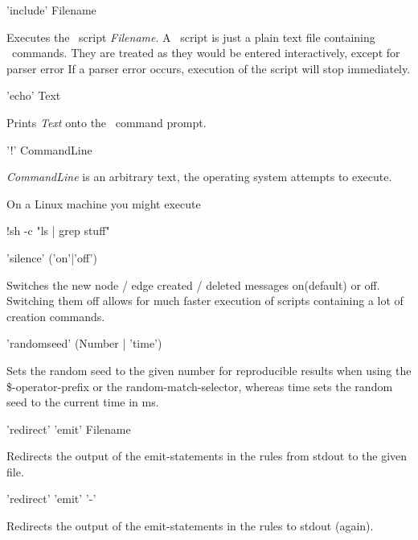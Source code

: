 \begin{rail}
  'include' Filename
\end{rail}
Executes the \GrShell\ script \emph{Filename}.
A \GrShell\ script is just a plain text file containing \GrShell\ commands.
They are treated as they would be entered interactively, except for parser error
If a parser error occurs, execution of the script will stop immediately.

\begin{rail}
  'echo' Text
\end{rail}
Prints \emph{Text} onto the \GrShell\ command prompt.

\begin{rail}
  '!' CommandLine
\end{rail}
\emph{CommandLine} is an arbitrary text, the operating system attempts to execute.
\begin{example}
On a Linux machine you might execute
\begin{grshell}
!sh -c "ls | grep stuff"
\end{grshell}
\end{example}

\begin{rail}
'silence' ('on'|'off')
\end{rail}
Switches the new node / edge created / deleted messages on(default) or off.
Switching them off allows for much faster execution of scripts containing a lot of creation commands.

\begin{rail}
'randomseed' (Number | 'time')
\end{rail}
Sets the random seed to the given number for reproducible results when using the \$-operator-prefix or the random-match-selector, whereas time sets the random seed to the current time in ms.

\begin{rail}
'redirect' 'emit' Filename
\end{rail}
Redirects the output of the emit-statements in the rules from stdout to the given file.

\begin{rail}
'redirect' 'emit' '-'
\end{rail}
Redirects the output of the emit-statements in the rules to stdout (again).



